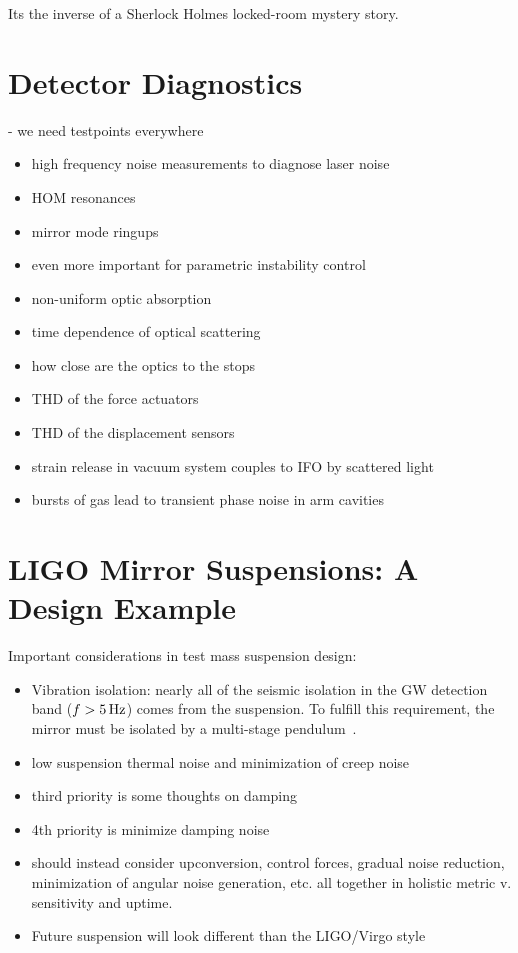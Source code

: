 Its the inverse of a Sherlock Holmes locked-room mystery story.


\section{Detector Diagnostics}
   - we need testpoints everywhere

\begin{itemize}
  \item high frequency noise measurements to diagnose laser noise
  \item HOM resonances
  \item mirror mode ringups
  \item even more important for parametric instability control\cite{Matt:PI}
  \item non-uniform optic absorption
  \item time dependence of optical scattering
  \item how close are the optics to the stops
  \item THD of the force actuators
  \item THD of the displacement sensors
  \item strain release in vacuum system couples to IFO by scattered light
  \item bursts of gas lead to transient phase noise in arm cavities
\end{itemize}

\section{LIGO Mirror Suspensions: A Design Example}

Important considerations in test mass suspension design\cite{SUS:2012, Aston:2012}:
\begin{itemize}
   \item Vibration isolation: nearly all of the seismic isolation in the GW detection band ($f > 5\,\rm Hz$)
     comes from the suspension. To fulfill this requirement, the mirror must be isolated by a 
     multi-stage pendulum~\cite{Beker:2011}.
    \item low suspension thermal noise and minimization of creep noise~\cite{Levin:2012ek, Gretarsson:2005gs}
    \item third priority is some thoughts on damping
    \item 4th priority is minimize damping noise
    \item should instead consider upconversion, control forces, gradual noise reduction, minimization of angular noise generation, etc. all together in holistic metric v. sensitivity and uptime.
    \item Future suspension will look different than the LIGO/Virgo style
\end{itemize}

